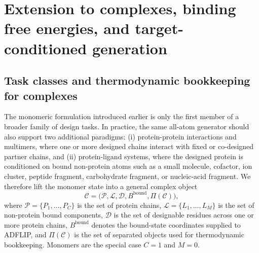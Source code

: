 \documentclass[11pt]{article}
\begin{document}
	
	\section{Extension to complexes, binding free energies, and target-conditioned generation}
	\label{sec:complexext}
	
	\subsection{Task classes and thermodynamic bookkeeping for complexes}
	
	The monomeric formulation introduced earlier is only the first member of a broader family of design tasks. In practice, the same all-atom generator should also support two additional paradigms: (i) protein-protein interactions and multimers, where one or more designed chains interact with fixed or co-designed partner chains, and (ii) protein-ligand systems, where the designed protein is conditioned on bound non-protein atoms such as a small molecule, cofactor, ion cluster, peptide fragment, carbohydrate fragment, or nucleic-acid fragment. We therefore lift the monomer state into a general complex object
	\begin{equation}
		\mathcal{C}=\big(\mathcal{P},\mathcal{L},\mathcal{D},B^{\mathrm{bound}},\Pi(\mathcal{C})\big),
	\end{equation}
	where $\mathcal{P}=\{P_1,\ldots,P_C\}$ is the set of protein chains, $\mathcal{L}=\{L_1,\ldots,L_M\}$ is the set of non-protein bound components, $\mathcal{D}$ is the set of designable residues across one or more protein chains, $B^{\mathrm{bound}}$ denotes the bound-state coordinates supplied to ADFLIP, and $\Pi(\mathcal{C})$ is the set of separated objects used for thermodynamic bookkeeping. Monomers are the special case $C=1$ and $M=0$.
	
\end{document}
